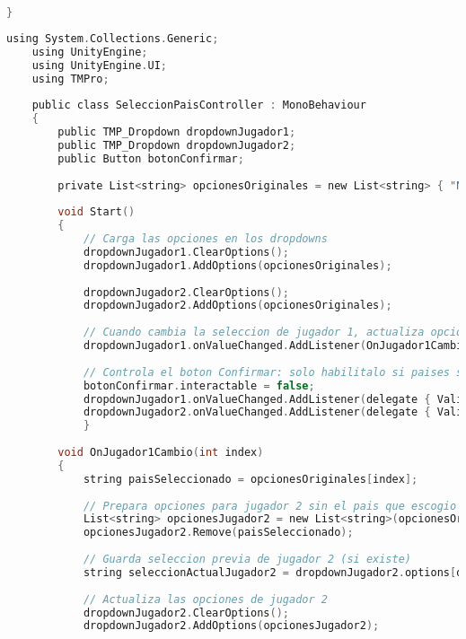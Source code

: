 \documentclass[a4paper,12pt]{article}
\begin{document}
\begin{itemize}
\begin{lstlisting}[language=c, caption={Clase Menú inicial}]
        }
    \end{lstlisting}

    \begin{lstlisting}[language=c, caption={SeleccionPaisController}]
    using System.Collections.Generic;
    using UnityEngine;
    using UnityEngine.UI;
    using TMPro;
        
    public class SeleccionPaisController : MonoBehaviour
    {
        public TMP_Dropdown dropdownJugador1;
        public TMP_Dropdown dropdownJugador2;
        public Button botonConfirmar;
        
        private List<string> opcionesOriginales = new List<string> { "Nueva Granada", "Ecuador", "Venezuela" };
        
        void Start()
        {
            // Carga las opciones en los dropdowns
            dropdownJugador1.ClearOptions();
            dropdownJugador1.AddOptions(opcionesOriginales);
        
            dropdownJugador2.ClearOptions();
            dropdownJugador2.AddOptions(opcionesOriginales);
        
            // Cuando cambia la seleccion de jugador 1, actualiza opciones de jugador 2
            dropdownJugador1.onValueChanged.AddListener(OnJugador1Cambio);
        
            // Controla el boton Confirmar: solo habilitalo si paises son diferentes
            botonConfirmar.interactable = false;
            dropdownJugador1.onValueChanged.AddListener(delegate { ValidarConfirmar(); });
            dropdownJugador2.onValueChanged.AddListener(delegate { ValidarConfirmar(); });
            }
        
        void OnJugador1Cambio(int index)
        {
            string paisSeleccionado = opcionesOriginales[index];
        
            // Prepara opciones para jugador 2 sin el pais que escogio jugador 1
            List<string> opcionesJugador2 = new List<string>(opcionesOriginales);
            opcionesJugador2.Remove(paisSeleccionado);
        
            // Guarda seleccion previa de jugador 2 (si existe)
            string seleccionActualJugador2 = dropdownJugador2.options[dropdownJugador2.value].text;
        
            // Actualiza las opciones de jugador 2
            dropdownJugador2.ClearOptions();
            dropdownJugador2.AddOptions(opcionesJugador2);
        

\end{lstlisting}
\end{itemize}
\end{document}
